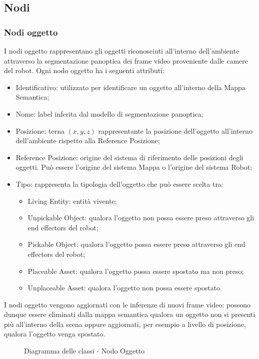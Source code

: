 \subsection{Nodi}
\subsubsection{Nodi oggetto}

I nodi oggetto rappresentano gli oggetti riconosciuti all'interno dell'ambiente attraverso la segmentazione panoptica dei frame video proveniente dalle camere del robot. Ogni nodo oggetto ha i seguenti attributi:
\begin{itemize}
  \item Identificativo: utilizzato per identificare un oggetto all'interno della Mappa Semantica;
  \item Nome: label inferita dal modello di segmentazione panoptica;
  \item Posizione: terna $(x, y, z)$ rappresentante la posizione dell'oggetto all'interno dell'ambiente rispetto alla Reference Posizione;
  \item Reference Posizione: origine del sistema di riferimento delle posizioni degli oggetti. Può essere l'origine del sistema Mappa o l'origine del sistema Robot;
  \item Tipo: rappresenta la tipologia dell'oggetto che può essere scelta tra:
        \begin{itemize}
          \item Living Entity: entità vivente;
          \item Unpickable Object: qualora l'oggetto non possa essere preso attraverso gli end effectors del robot;
          \item Pickable Object: qualora l'oggetto possa essere preso attraverso gli end effectors del robot;
          \item Placeable Asset: qualora l'oggetto possa essere spostato ma non preso;
          \item Unplaceable Asset: qualora l'oggetto non possa essere spostato.
        \end{itemize}
\end{itemize}
I nodi oggetto vengono aggiornati con le inferenze di nuovi frame video: possono dunque essere eliminati dalla mappa semantica qualora un oggetto non si presenti più all'interno della scena oppure aggiornati, per esempio a livello di posizione, qualora l'oggetto venga spostato.

\begin{figure}[h]
  \centering
  \caption{Diagramma delle classi - Nodo Oggetto}
\end{figure}

